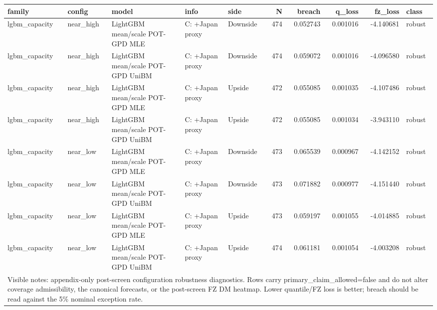 \begin{tabular}{lll l lrrrrl}
\toprule
family & config & model & info & side & N & breach & q_loss & fz_loss & class \\
\midrule
lgbm\_capacity & near\_high & LightGBM mean/scale POT-GPD MLE & C: +Japan proxy & Downside & 474 & 0.052743 & 0.001016 & -4.140681 & robust \\
lgbm\_capacity & near\_high & LightGBM mean/scale POT-GPD UniBM & C: +Japan proxy & Downside & 474 & 0.059072 & 0.001016 & -4.096580 & robust \\
lgbm\_capacity & near\_high & LightGBM mean/scale POT-GPD MLE & C: +Japan proxy & Upside & 472 & 0.055085 & 0.001035 & -4.107486 & robust \\
lgbm\_capacity & near\_high & LightGBM mean/scale POT-GPD UniBM & C: +Japan proxy & Upside & 472 & 0.055085 & 0.001034 & -3.943110 & robust \\
lgbm\_capacity & near\_low & LightGBM mean/scale POT-GPD MLE & C: +Japan proxy & Downside & 473 & 0.065539 & 0.000967 & -4.142152 & robust \\
lgbm\_capacity & near\_low & LightGBM mean/scale POT-GPD UniBM & C: +Japan proxy & Downside & 473 & 0.071882 & 0.000977 & -4.151440 & robust \\
lgbm\_capacity & near\_low & LightGBM mean/scale POT-GPD MLE & C: +Japan proxy & Upside & 473 & 0.059197 & 0.001055 & -4.014885 & robust \\
lgbm\_capacity & near\_low & LightGBM mean/scale POT-GPD UniBM & C: +Japan proxy & Upside & 474 & 0.061181 & 0.001054 & -4.003208 & robust \\
\midrule
\multicolumn{10}{l}{\footnotesize Visible notes: appendix-only post-screen configuration robustness diagnostics. Rows carry primary\_claim\_allowed=false and do not alter coverage admissibility, the canonical forecasts, or the post-screen FZ DM heatmap. Lower quantile/FZ loss is better; breach should be read against the 5\% nominal exception rate.} \\
\bottomrule
\end{tabular}
